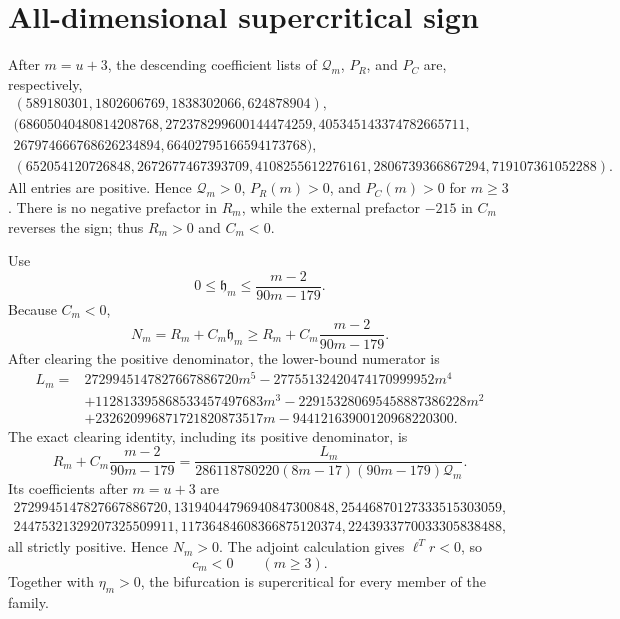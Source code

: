 \section*{All-dimensional supercritical sign}
After $m=u+3$, the descending coefficient lists of $\mathcal Q_m$, $P_R$,
and $P_C$ are, respectively,
\[
\begin{gathered}
(589180301,1802606769,1838302066,624878904),\\
(68605040480814208768,272378299600144474259,
405345143374782665711,\\
267974666768626234894,66402795166594173768),\\
(652054120726848,2672677467393709,4108255612276161,
2806739366867294,719107361052288).
\end{gathered}
\]
All entries are positive.  Hence $\mathcal Q_m>0$, $P_R(m)>0$, and
$P_C(m)>0$ for $m\ge3$.  There is no negative prefactor in $R_m$, while the
external prefactor $-215$ in $C_m$ reverses the sign; thus $R_m>0$ and
$C_m<0$.

Use
\[
0\le \mathfrak h_m\le\frac{m-2}{90m-179}.
\]
Because $C_m<0$,
\[
N_m=R_m+C_m\mathfrak h_m
\ge R_m+C_m\frac{m-2}{90m-179}.
\]
After clearing the positive denominator, the lower-bound numerator is
\[
\begin{aligned}
L_m={}&2729945147827667886720m^5
-27755132420474170999952m^4\\
&+112813395868533457497683m^3
-229153280695458887386228m^2\\
&+232620996871721820873517m
-94412163900120968220300.
\end{aligned}
\]
The exact clearing identity, including its positive denominator, is
\[
 R_m+C_m\frac{m-2}{90m-179}
 =\frac{L_m}{286118780220(8m-17)(90m-179)\mathcal Q_m}.
\]
Its coefficients after $m=u+3$ are
\[
\begin{gathered}
2729945147827667886720,
13194044796940847300848,
25446870127333515303059,\\
24475321329207325509911,
11736484608366875120374,
2243933770033305838488,
\end{gathered}
\]
all strictly positive.  Hence $N_m>0$.  The adjoint calculation gives
$\ell^Tr<0$, so
\[
\boxed{c_m<0\qquad(m\ge3).}
\]
Together with $\eta_m>0$, the bifurcation is supercritical for every member of
the family.
